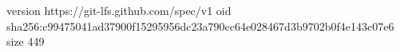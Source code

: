 version https://git-lfs.github.com/spec/v1
oid sha256:c99475041ad37900f15295956dc23a790cc64e028467d3b9702b0f4e143c07e6
size 449
